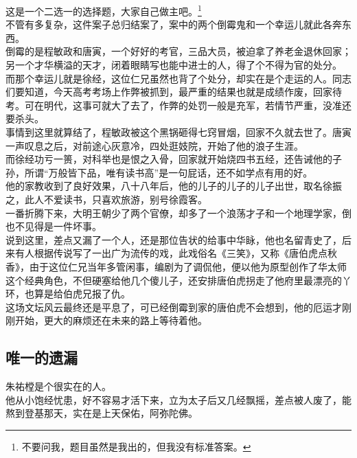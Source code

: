 \begin{multicols}{\theparacolNo}
这是一个二选一的选择题，大家自己做主吧。\footnote{不要问我，题目虽然是我出的，但我没有标准答案。}\\

不管有多复杂，这件案子总归结案了，案中的两个倒霉鬼和一个幸运儿就此各奔东西。\\

倒霉的是程敏政和唐寅，一个好好的考官，三品大员，被迫拿了养老金退休回家；另一个才华横溢的天才，闭着眼睛写也能中进士的人，得了个不得为官的处分。\\

而那个幸运儿就是徐经，这位仁兄虽然也背了个处分，却实在是个走运的人。同志们要知道，今天高考考场上作弊被抓到，最严重的结果也就是成绩作废，回家待考。可在明代，这事可就大了去了，作弊的处罚一般是充军，若情节严重，没准还要杀头。\\

事情到这里就算结了，程敏政被这个黑锅砸得七窍冒烟，回家不久就去世了。唐寅一声叹息之后，对前途心灰意冷，四处逛妓院，开始了他的浪子生涯。\\

而徐经功亏一篑，对科举也是恨之入骨，回家就开始烧四书五经，还告诫他的子孙，所谓“万般皆下品，唯有读书高”是一句屁话，还不如学点有用的好。\\

他的家教收到了良好效果，八十八年后，他的儿子的儿子的儿子出世，取名徐振之，此人不爱读书，只喜欢旅游，别号徐霞客。\\

一番折腾下来，大明王朝少了两个官僚，却多了一个浪荡才子和一个地理学家，倒也不见得是一件坏事。\\

说到这里，差点又漏了一个人，还是那位告状的给事中华眿，他也名留青史了，后来有人根据传说写了一出广为流传的戏，此戏俗名《三笑》，又称《唐伯虎点秋香》，由于这位仁兄当年多管闲事，编剧为了调侃他，便以他为原型创作了华太师这个经典角色，不但硬塞给他几个傻儿子，还安排唐伯虎拐走了他府里最漂亮的丫环，也算是给伯虎兄报了仇。\\

这场文坛风云最终还是平息了，可已经倒霉到家的唐伯虎不会想到，他的厄运才刚刚开始，更大的麻烦还在未来的路上等待着他。\\

\subsection{唯一的遗漏}
朱祐樘是个很实在的人。\\

他从小饱经忧患，好不容易才活下来，立为太子后又几经飘摇，差点被人废了，能熬到登基那天，实在是上天保佑，阿弥陀佛。\\


\end{multicols}
